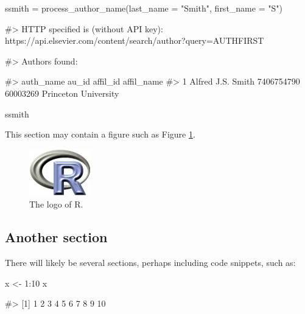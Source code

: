\begin{Schunk}
\begin{Sinput}
ssmith = process_author_name(last_name = "Smith", first_name = "S")
\end{Sinput}
\begin{Soutput}
#> HTTP specified is (without API key): https://api.elsevier.com/content/search/author?query=AUTHFIRST%
\end{Soutput}
\begin{Soutput}
#> Authors found:
\end{Soutput}
\begin{Soutput}
#>           auth_name      au_id affil_id           affil_name
#> 1 Alfred J.S. Smith 7406754790 60003269 Princeton University
\end{Soutput}
\begin{Sinput}
ssmith
\end{Sinput}
\end{Schunk}

This section may contain a figure such as Figure \ref{figure:rlogo}.

\begin{figure}[htbp]
  \centering
  \includegraphics{Rlogo}
  \caption{The logo of R.}
  \label{figure:rlogo}
\end{figure}

\hypertarget{another-section}{%
\subsection{Another section}\label{another-section}}

There will likely be several sections, perhaps including code snippets,
such as:

\begin{Schunk}
\begin{Sinput}
x <- 1:10
x
\end{Sinput}
\begin{Soutput}
#>  [1]  1  2  3  4  5  6  7  8  9 10
\end{Soutput}
\end{Schunk}

